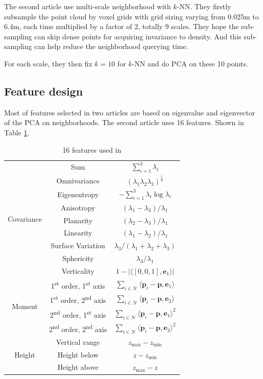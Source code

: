 \documentclass{article}
\begin{document}
The second article \cite{hackel2016fast} use multi-scale neighborhood with $k$-NN. They firstly subsample the point cloud by voxel grids with grid sizing varying from 0.025m to 6.4m, each time multiplied by a factor of 2, totally 9 scales. They hope the sub-sampling can skip dense points for acquiring invariance to density. And this sub-sampling can help reduce the neighborhood querying time.

For each scale, they then fix $k=10$ for $k$-NN and do PCA on these 10 points.
\subsection{Feature design}
Most of features selected in two articles are based on eigenvalue and eigenvector of the PCA on neighborhoods. 
The second article \cite{hackel2016fast} uses 16 features. Shown in Table \ref{table:1}.
\begin{table}[h!]
	\centering
	\begin{tabular}{|c | c | c |} 
		\hline
		\multirow{9}{*}{Covariance}
		& Sum & $\sum_{i=1}^{3}\lambda_i$ \\ 
		& Omnivariance & $(\lambda_1 \lambda_2 \lambda_3)^{\frac{1}{3}}$ \\ 
		& Eigenentropy & $-\sum_{i=1}^{3}\lambda_i \log \lambda_i$ \\ 
		& Anisotropy & $(\lambda_1-\lambda_3)/\lambda_1$ \\ 
		& Planarity & $(\lambda_2-\lambda_3)/\lambda_1$ \\ 
		& Linearity & $(\lambda_1-\lambda_2)/\lambda_1$ \\ 
		& Surface Variation & $\lambda_3/(\lambda_1+\lambda_2+\lambda_3)$ \\ 
		& Sphericity & $\lambda_3/\lambda_1$ \\ 
		& Verticality & $1-|\langle [0,0,1], \mathbf{e}_1\rangle|$ \\ 
		\hline
		\multirow{4}{*}{Moment}
		& 1\textsuperscript{st} order, 1\textsuperscript{st} axis  & $\sum_{i\in \mathcal{N}}\langle \mathbf{p}_i-\mathbf{p}, \mathbf{e}_1\rangle$ \\ 
		& 1\textsuperscript{st} order, 2\textsuperscript{nd} axis & $\sum_{i\in \mathcal{N}}\langle \mathbf{p}_i-\mathbf{p}, \mathbf{e}_2\rangle$ \\ 
		& 2\textsuperscript{nd} order, 1\textsuperscript{st} axis & $\sum_{i\in \mathcal{N}}\langle \mathbf{p}_i-\mathbf{p}, \mathbf{e}_1\rangle^2$ \\ 
		& 2\textsuperscript{nd} order, 2\textsuperscript{nd} axis & $\sum_{i\in \mathcal{N}}\langle \mathbf{p}_i-\mathbf{p}, \mathbf{e}_2\rangle^2$ \\ 
		\hline
		\multirow{4}{*}{Height}
		& Vertical range & $z_{\text{max}}-z_{\text{min}}$ \\ 
		& Height below & $z-z_{\text{min}}$ \\ 
		& Height above & $z_{\text{max}}-z$ \\ 
		\hline
	\end{tabular}
	\caption{16 features used in \cite{hackel2016fast}}
	\label{table:1}
\end{table}
\end{document}
